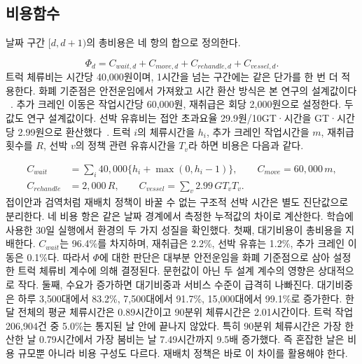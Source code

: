 \subsection{비용함수}
\label{sec:env-cost}
날짜 구간 $[d,d+1)$의 총비용은 네 항의 합으로 정의한다.

\begin{equation}
\Phi_d=C_{wait,d}+C_{move,d}+C_{rehandle,d}+C_{vessel,d}.
\end{equation}
트럭 체류비는 시간당 40,000원이며, 1시간을 넘는 구간에는 같은 단가를 한 번 더
적용한다. 화폐 기준점은 안전운임에서 가져왔고 시간 환산 방식은 본 연구의 설계값이다
~\cite{ref24}. 추가 크레인 이동은 작업시간당 60,000원, 재취급은 회당 2,000원으로
설정한다. 두 값도 연구 설계값이다. 선박 유휴비는 접안 초과요율 29.9원/10GT·시간을
GT·시간당 2.99원으로 환산했다~\cite{ref25}. 트럭 $i$의 체류시간을 $h_i$, 추가 크레인
작업시간을 $m$, 재취급 횟수를 $R$, 선박 $v$의 정책 관련 유휴시간을 $T_v$라 하면
비용은 다음과 같다.

\begin{equation}
\begin{aligned}
C_{wait}&=\sum_i 40{,}000\{h_i+\max(0,h_i-1)\},\qquad
C_{move}=60{,}000\,m,\\
C_{rehandle}&=2{,}000\,R,\qquad
C_{vessel}=\sum_v 2.99\,GT_v T_v.
\end{aligned}
\end{equation}
접이안과 검역처럼 재배치 정책이 바꿀 수 없는 구조적 선박 시간은 별도 진단값으로
분리한다. 네 비용 항은 같은 날짜 경계에서 측정한 누적값의 차이로 계산한다.
학습에 사용한 30일 실행에서 환경의 두 가지 성질을 확인했다. 첫째, 대기비용이
총비용을 지배한다. $C_{wait}$는 96.4\%를 차지하며, 재취급은 2.2\%, 선박 유휴는
1.2\%, 추가 크레인 이동은 0.1\%다. 따라서 $\Phi$에 대한 판단은 대부분 안전운임을
화폐 기준점으로 삼아 설정한 트럭 체류비 계수에 의해 결정된다. 문헌값이 아닌 두 설계 계수의 영향은
상대적으로 작다. 둘째, 수요가 증가하면 대기비중과 서비스 수준이 급격히 나빠진다.
대기비중은 하루 3{,}500대에서 83.2\%, 7{,}500대에서 91.7\%, 15{,}000대에서
99.1\%로 증가한다. 한 달 전체의 평균 체류시간은 0.89시간이고 90분위 체류시간은
2.01시간이다. 트럭 작업 206{,}904건 중 5.0\%는 통지된 날 안에 끝나지 않았다. 특히
90분위 체류시간은 가장 한산한 날 0.79시간에서 가장 붐비는 날 7.49시간까지 9.5배
증가했다. 즉 혼잡한 날은 비용 규모뿐 아니라 비용 구성도 다르다. 재배치 정책은 바로 이
차이를 활용해야 한다.
